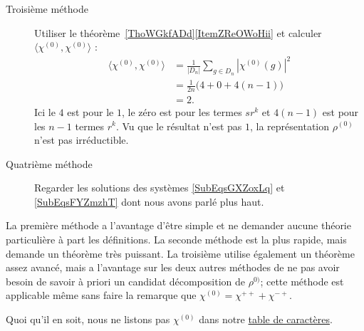 \begin{enumerate}
\begin{description}
    \item[Troisième méthode]
        Utiliser le théorème~\ref{ThoWGkfADd}\ref{ItemZReOWoHii} et calculer \( \langle \chi^{(0)}, \chi^{(0)}\rangle \) :
        \begin{subequations}
            \begin{align}
                \langle \chi^{(0)}, \chi^{(0)}\rangle &=\frac{1}{ | D_n | }\sum_{g\in D_n}| \chi^{(0)}(g) |^2\\
                &=\frac{1}{ 2n }\big(4+0+4(n-1)\big)\\
                &=2.
            \end{align}
        \end{subequations}
        Ici le \( 4\) est pour le \( 1\), le zéro est pour les termes \( sr^k\) et \( 4(n-1)\) est pour les \( n-1\) termes \( r^k\). Vu que le résultat n'est pas \( 1\), la représentation \( \rho^{(0)}\) n'est pas irréductible.

    \item[Quatrième méthode]
        Regarder les solutions des systèmes \eqref{SubEqsGXZoxLq} et \eqref{SubEqsFYZmzhT} dont nous avons parlé plus haut.

    \end{description}

    La première méthode a l'avantage d'être simple et ne demander aucune théorie particulière à part les définitions. La seconde méthode est la plus rapide, mais demande un théorème très puissant. La troisième utilise également un théorème assez avancé, mais a l'avantage sur les deux autres méthodes de ne pas avoir besoin de savoir à priori un candidat décomposition de \( \rho^{0)}\); cette méthode est applicable même sans faire la remarque que \( \chi^{(0)}=\chi^{++}+\chi^{-+}\).

    Quoi qu'il en soit, nous ne listons pas \( \chi^{(0)}\) dans notre \href{http://fr.wikipedia.org/wiki/Aide:Unicode}{table de caractères}.


\end{enumerate}
